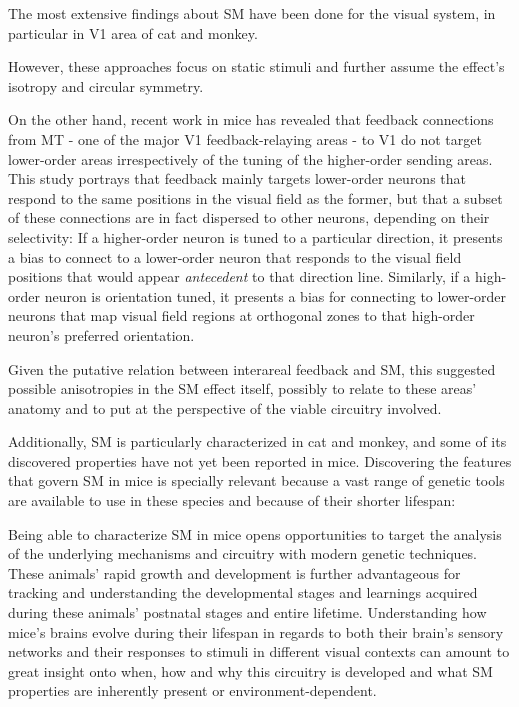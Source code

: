 The most extensive findings about SM have been done for the visual system, in particular in V1 area of cat and monkey.

However, these approaches focus on static stimuli and further assume the effect's isotropy and circular symmetry. 

On the other hand, recent work in mice has revealed that feedback connections from MT - one of the major V1 feedback-relaying areas - to V1 do not target lower-order areas irrespectively of the tuning of the higher-order sending areas. This study portrays that feedback mainly targets lower-order neurons that respond to the same positions in the visual field as the former, but that a subset of these connections are in fact dispersed to other neurons, depending on their selectivity: If a higher-order neuron is tuned to a particular direction, it presents a bias to connect to a lower-order neuron that responds to the visual field positions that would appear \textit{antecedent} to that direction line. Similarly, if a high-order neuron is orientation tuned, it presents a bias for connecting to lower-order neurons that map visual field regions at orthogonal zones to that high-order neuron's preferred orientation. 

Given the putative relation between interareal feedback and SM, this suggested possible anisotropies in the SM effect itself, possibly to relate to these areas' anatomy and to put at the perspective of the viable circuitry involved.

Additionally, SM is particularly characterized in cat and monkey, and some of its discovered properties have not yet been reported in mice. Discovering the features that govern SM in mice is specially relevant because a vast range of genetic tools are available to use in these species and because of their shorter lifespan:

Being able to characterize SM in mice opens opportunities to target the analysis of the underlying mechanisms and circuitry with modern genetic techniques. These animals' rapid growth and development is further advantageous for tracking and understanding the developmental stages and learnings acquired during these animals' postnatal stages and entire lifetime. Understanding how mice's brains evolve during their lifespan in regards to both their brain's sensory networks and their responses to stimuli in different visual contexts can amount to great insight onto when, how and why this circuitry is developed and what SM properties are inherently present or environment-dependent.

